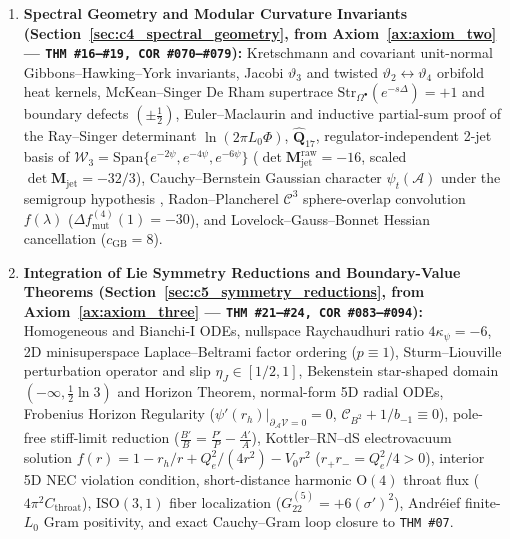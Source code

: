 \documentclass[11pt,a4paper]{article}
\newcommand{\catH}{\text{\textbf{\textcolor{orange!80!black}{[H]}}}}
\theoremstyle{definition}
\theoremstyle{plain}
\theoremstyle{remark}
\begin{document}
\begin{enumerate}[label=\textbf{Stage \arabic*.}, leftmargin=2.2cm]
  \item \textbf{Spectral Geometry and Modular Curvature Invariants (Section~\ref{sec:c4_spectral_geometry}, from Axiom~\ref{ax:axiom_two} --- \texttt{THM~\#16--\#19, COR~\#070--\#079}):} Kretschmann and covariant unit-normal Gibbons--Hawking--York invariants, Jacobi $\vartheta_3$ and twisted $\vartheta_2 \leftrightarrow \vartheta_4$ orbifold heat kernels, McKean--Singer De Rham supertrace $\mathrm{Str}_{\Omega^\bullet}(e^{-s\Delta}) = +1$ and boundary defects $(\pm\frac{1}{2})$, Euler--Maclaurin and inductive partial-sum proof of the Ray--Singer determinant $\ln(2\pi L_0\Phi)$, $\widehat{\mathbf{Q}}_{17}$, regulator-independent 2-jet basis of $\mathcal{W}_3 = \mathrm{Span}\{e^{-2\psi}, e^{-4\psi}, e^{-6\psi}\}$ ($\det\mathbf{M}_{\mathrm{jet}}^{\mathrm{raw}}=-16$, scaled $\det\mathbf{M}_{\mathrm{jet}}=-32/3$), Cauchy--Bernstein Gaussian character $\psi_t(\mathcal{A})$ under the semigroup hypothesis \catH, Radon--Plancherel $\mathcal{C}^3$ sphere-overlap convolution $f(\lambda)$ ($\Delta f_{\mathrm{mut}}^{(4)}(1)=-30$), and Lovelock--Gauss--Bonnet Hessian cancellation ($c_{\mathrm{GB}}=8$).
  \item \textbf{Integration of Lie Symmetry Reductions and Boundary-Value Theorems (Section~\ref{sec:c5_symmetry_reductions}, from Axiom~\ref{ax:axiom_three} --- \texttt{THM~\#21--\#24, COR~\#083--\#094}):} Homogeneous and Bianchi-I ODEs, nullspace Raychaudhuri ratio $4\kappa_\psi=-6$, 2D minisuperspace Laplace--Beltrami factor ordering ($p \equiv 1$), Sturm--Liouville perturbation operator and slip $\eta_J \in [1/2, 1]$, Bekenstein star-shaped domain $(-\infty, \frac{1}{2}\ln 3)$ and Horizon Theorem, normal-form 5D radial ODEs, Frobenius Horizon Regularity ($\psi'(r_h)\big|_{\partial_{\mathcal{A}}\mathcal{V}=0}=0$, $\mathcal{C}_{B^2} + 1/b_{-1} \equiv 0$), pole-free stiff-limit reduction ($\frac{B'}{B} = \frac{P'}{P} - \frac{A'}{A}$), Kottler--RN--dS electrovacuum solution $f(r) = 1 - r_h/r + Q_e^2/(4r^2) - V_0 r^2$ ($r_+ r_- = Q_e^2/4 > 0$), interior 5D NEC violation condition, short-distance harmonic $\mathrm{O}(4)$ throat flux ($4\pi^2 C_{\mathrm{throat}}$), $\mathrm{ISO}(3,1)$ fiber localization ($G^{(5)}_{22}=+6(\sigma')^2$), Andr\'eief finite-$L_0$ Gram positivity, and exact Cauchy--Gram loop closure to \texttt{THM~\#07}.

\end{enumerate}
\end{document}
